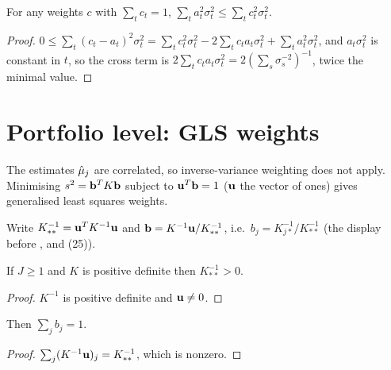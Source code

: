 \begin{theorem}[Eq.\ (23) is optimal]\label{thm:invVarWeight_optimal}
  \leanok
  For any weights $c$ with $\sum_t c_t = 1$,
  $\sum_t a_t^2\sigma_t^2 \le \sum_t c_t^2\sigma_t^2$.
\end{theorem}
\begin{proof}
  \leanok
  $0 \le \sum_t (c_t - a_t)^2\sigma_t^2
    = \sum_t c_t^2\sigma_t^2 - 2\sum_t c_t a_t\sigma_t^2 + \sum_t a_t^2\sigma_t^2$,
  and $a_t\sigma_t^2$ is constant in $t$, so the cross term is
  $2\sum_t c_t a_t\sigma_t^2 = 2(\sum_s\sigma_s^{-2})^{-1}$, twice the
  minimal value.
\end{proof}

\section{Portfolio level: GLS weights}

The estimates $\hat\mu_j$ are correlated, so inverse-variance weighting does
not apply. Minimising $s^2 = \mathbf{b}^T K \mathbf{b}$ subject to $\mathbf{u}^T\mathbf{b} = 1$
($\mathbf{u}$ the vector of ones) gives generalised least squares weights.

\begin{definition}\label{def:glsWeight}
  \leanok
  Write $K^{-1}_{**} = \mathbf{u}^T K^{-1}\mathbf{u}$ and
  $\mathbf{b} = K^{-1}\mathbf{u} / K^{-1}_{**}$, i.e.\ $b_j = K^{-1}_{j*}/K^{-1}_{**}$
  (the display before , and (25)).
\end{definition}

\begin{lemma}\label{lem:invTotal_pos}
  \leanok
  If $J \ge 1$ and $K$ is positive definite then $K^{-1}_{**} > 0$.
\end{lemma}
\begin{proof}
  \leanok
  $K^{-1}$ is positive definite and $\mathbf{u} \ne 0$.
\end{proof}

\begin{lemma}\label{lem:sum_glsWeight}
  \leanok
  Then $\sum_j b_j = 1$.
\end{lemma}
\begin{proof}
  \leanok
  $\sum_j (K^{-1}\mathbf{u})_j = K^{-1}_{**}$, which is nonzero.
\end{proof}

